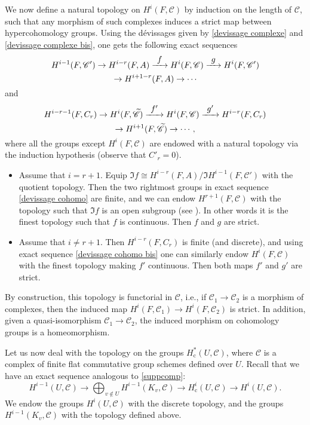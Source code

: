 \documentclass[11pt]{article}
\newcommand{\ie}{i.e.,\xspace}
\let\mathcal\mathscr
\newcommand\To[1]{\mathchoice{\xrightarrow{\textstyle\kern4pt#1\kern3pt}}{\stackrel{#1}{\longrightarrow}}{}{}}
\newcommand{\rc}{\mathrm{c}}
\theoremstyle{plain}
\theoremstyle{definition}
\newcommand \cC {\mathcal{C}}
\begin{document}
We now define a natural topology on $H^i(F, \cC)$ by induction on the length of $\cC$, such that any morphism of such complexes induces a strict map between hypercohomology groups. Using the dévissages given by \eqref{devissage complexe} and \eqref{devissage complexe bis}, one gets the following exact sequences\vspace*{-3pt}
\begin{multline} \label{devissage cohomo}
H^{i-1}(F, \cC') \to H^{i-r}(F,A) \To{f} H^i(F, \cC) \To{g} H^i(F, \cC')\\ \to H^{i+1-r}(F,A) \to \cdots\vspace*{-3pt}
\end{multline}
and\vspace*{-3pt}
\begin{multline} \label{devissage cohomo bis}
H^{i-r-1}(F, C_r) \to H^{i}(F,\widetilde{\cC}) \To{f'} H^i(F, \cC) \To{g'} H^{i-r}(F, C_r)\\ \to H^{i+1}(F,\widetilde{\cC}) \to \cdots,\vspace*{-3pt}
\end{multline}
where all the groups except $H^i(F, \cC)$ are endowed with a
natural topology via the induction hypothesis (observe that $C'_r=0$).
\begin{itemize}
\item Assume that $i = r+1$. Equip $\Im f\cong H^{i-r}(F,A)/
\Im H^{i-1}(F, \cC')$ with the quotient topology.
Then the two rightmost groups in exact sequence \eqref{devissage cohomo} are finite, and we can endow $H^{r+1}(F, \cC)$ with the topology such that
$\Im f$ is an open subgroup (see \cite[beginning of \S 3]{DemH}).
In other words it is the
finest topology such that $f$ is continuous. Then $f$ and $g$ are strict.
\item Assume that $i \neq r+1$. Then $H^{i-r}(F,C_r)$ is finite (and discrete), and using exact sequence \eqref{devissage cohomo bis} one can similarly
endow $H^i(F, \cC)$ with the finest topology making $f'$ continuous. Then both maps $f'$ and $g'$ are strict.
\end{itemize}
By construction, this topology is functorial in $\cC$, \ie if $\cC_1 \to \cC_2$ is a morphism of complexes, then the induced map $H^i(F, \cC_1) \to H^i(F, \cC_2)$ is strict. In addition, given a quasi-isomorphism $\cC_1 \to \cC_2$, the induced morphism on cohomology groups is a homeomorphism.

Let us now deal with the topology on the groups $H^*_\rc(U, \cC)$, where $\cC$ is a complex of finite flat commutative group schemes defined over $U$. Recall that we have an exact sequence analogous to \eqref{suppcomp}:
\begin{equation} \label{long exact seq compact supp}
H^{i-1}(U,\cC) \to \bigoplus_{v \notin U} H^{i-1}(K_v,\cC) \to H^{i}_\rc(U,\cC) \to H^{i}(U,\cC).
\end{equation}
We endow the groups $H^{i}(U,\!\cC)$ with the discrete topology, and the groups~$H^{i-1}(K_v,\!\cC)$ with the topology defined above.
\end{document}
